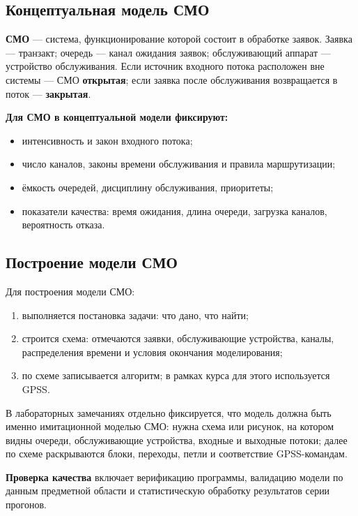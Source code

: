 \subsection*{Концептуальная модель СМО}

\textbf{СМО} — система, функционирование которой состоит в обработке заявок. Заявка — транзакт; очередь — канал ожидания заявок; обслуживающий аппарат — устройство обслуживания. Если источник входного потока расположен вне системы — СМО \textbf{открытая}; если заявка после обслуживания возвращается в поток — \textbf{закрытая}.

\textbf{Для СМО в концептуальной модели фиксируют:}
\begin{itemize}
  \item интенсивность и закон входного потока;
  \item число каналов, законы времени обслуживания и правила маршрутизации;
  \item ёмкость очередей, дисциплину обслуживания, приоритеты;
  \item показатели качества: время ожидания, длина очереди, загрузка каналов, вероятность отказа.
\end{itemize}

\subsection*{Построение модели СМО}

Для построения модели СМО:
\begin{enumerate}
  \item выполняется постановка задачи: что дано, что найти;
  \item строится схема: отмечаются заявки, обслуживающие устройства, каналы, распределения времени и условия окончания моделирования;
  \item по схеме записывается алгоритм; в рамках курса для этого используется GPSS.
\end{enumerate}

В лабораторных замечаниях отдельно фиксируется, что модель должна быть именно имитационной моделью СМО: нужна схема или рисунок, на котором видны очереди, обслуживающие устройства, входные и выходные потоки; далее по схеме раскрываются блоки, переходы, петли и соответствие GPSS-командам.

\textbf{Проверка качества} включает верификацию программы, валидацию модели по данным предметной области и статистическую обработку результатов серии прогонов.

\clearpage
